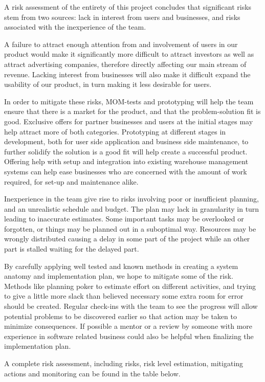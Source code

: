 \documentclass[titlepage]{article}
\begin{document}
A risk assessment of the entirety of this project concludes that significant risks stem from two sources: lack in interest from users and businesses, and risks associated with the inexperience of the team.

A failure to attract enough attention from and involvement of users in our product would make it significantly more difficult to attract investors as well as attract advertising companies, therefore directly affecting our main stream of revenue. Lacking interest from businesses will also make it difficult expand the usability of our product, in turn making it less desirable for users.

In order to mitigate these risks, MOM-tests and prototyping will help the team ensure that there is a market for the product, and that the problem-solution fit is good. Exclusive offers for partner businesses and users at the initial stages may help attract more of both categories. Prototyping at different stages in development, both for user side application and business side maintenance, to further solidify the solution is a good fit will help create a successful product. Offering help with setup and integration into existing warehouse management systems can help ease businesses who are concerned with the amount of work required, for set-up and maintenance alike. 

Inexperience in the team give rise to risks involving poor or insufficient planning, and an unrealistic schedule and budget. The plan may lack in granularity in turn leading to inaccurate estimates. Some important tasks may be overlooked or forgotten, or things may be planned out in a suboptimal way. Resources may be wrongly distributed causing a delay in some part of the project while an other part is stalled waiting for the delayed part.

By carefully applying well tested and known methods in creating a system anatomy and implementation plan, we hope to mitigate some of the risk. Methods like planning poker to estimate effort on different activities, and trying to give a little more slack than believed necessary some extra room for error should be created. Regular check-ins with the team to see the progress will allow potential problems to be discovered earlier so that action may be taken to minimize consequences. If possible a mentor or a review by someone with more experience in software related business could also be helpful when finalizing the implementation plan.

A complete risk assessment, including risks, risk level estimation, mitigating actions and monitoring can be found in the table below.
\end{document}
